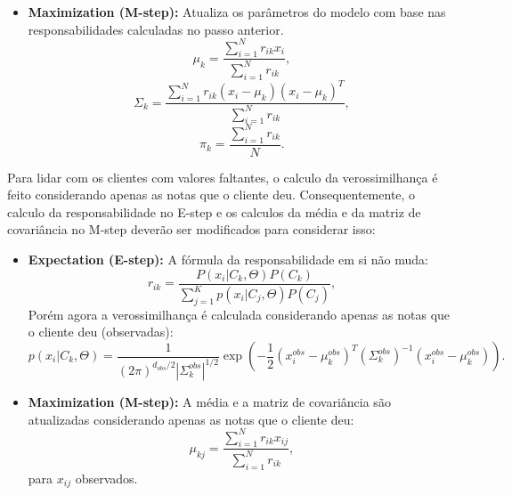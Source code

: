 \begin{enumerate}
\begin{tcolorbox}[title=Resposta:]
\begin{itemize}
    \end{itemize}

    \end{tcolorbox}

    \begin{tcolorbox}[title=Resposta (continuação):]
        \begin{itemize}

        \item \textbf{Maximization (M-step):} Atualiza os parâmetros do modelo com base nas responsabilidades calculadas no passo anterior.
        \begin{equation}
            \mu_k = \frac{\sum_{i=1}^{N}r_{ik}x_i}{\sum_{i=1}^{N}r_{ik}},
        \end{equation}
        \begin{equation}
            \Sigma_k = \frac{\sum_{i=1}^{N}r_{ik}(x_i - \mu_k)(x_i - \mu_k)^T}{\sum_{i=1}^{N}r_{ik}},
        \end{equation}
        \begin{equation}
            \pi_k = \frac{\sum_{i=1}^{N}r_{ik}}{N}.
        \end{equation}

    \end{itemize}
    
    
    Para lidar com os clientes com valores faltantes, o calculo da verossimilhança é feito considerando apenas as notas que o cliente deu. Consequentemente, o calculo da responsabilidade no E-step e os calculos da média e da matriz de covariância no M-step deverão ser modificados para considerar isso:

    \begin{itemize}
        \item \textbf{Expectation (E-step):} 
        A fórmula da responsabilidade em si não muda:
        \begin{equation}
            r_{ik} = \frac{P(x_i | C_k, \Theta)P(C_k)}{\sum_{j=1}^{K}p(x_i | C_j, \Theta)P(C_j)},
        \end{equation}
        Porém agora a verossimilhança é calculada considerando apenas as notas que o cliente deu (observadas):
        \begin{equation}
            p(x_i | C_k, \Theta) = \frac{1}{(2\pi)^{d_{obs}/2}|\Sigma_k^{obs}|^{1/2}} \exp\left(-\frac{1}{2}(x_i^{obs} - \mu_k^{obs})^T(\Sigma_k^{obs})^{-1}(x_i^{obs} - \mu_k^{obs})\right).
        \end{equation}

        \item \textbf{Maximization (M-step):}
        A média e a matriz de covariância são atualizadas considerando apenas as notas que o cliente deu:
        \begin{equation}
            \mu_{kj} = \frac{\sum_{i=1}^{N}r_{ik}x_{ij}}{\sum_{i=1}^{N}r_{ik}},
        \end{equation}
       para $x_{ij}$ observados. 
        

\end{itemize}
\end{tcolorbox}
\end{enumerate}
